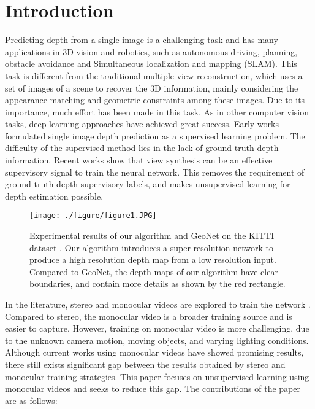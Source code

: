 \documentclass[10pt,twocolumn,letterpaper]{article}
\begin{document}
\section{Introduction}

Predicting depth from a single image is a challenging task and has many applications in 3D vision and robotics, such as autonomous driving, planning, obstacle avoidance and Simultaneous localization and mapping (SLAM). This task is different from the traditional multiple view reconstruction, which uses a set of images of a scene to recover the 3D information, mainly considering the appearance matching and geometric constraints among these images. Due to its importance, much effort has been made in this task. As in other computer vision tasks, deep learning approaches have achieved great
success. Early works \cite{li2015depth,liu2015deep,wang2015towards,liu2016learning} formulated single image depth prediction as a supervised learning problem. The difficulty of the supervised method lies in the lack of ground truth depth information. Recent works \cite{godard2017unsupervised,zhou2017unsupervised,godard2017unsupervised,zou2018df,zhan2018unsupervised,wang2018learning,yang2018unsupervised,aleotti2018generative} show that view synthesis can be an effective supervisory signal to train the neural network. This removes the requirement of ground truth depth supervisory labels, and makes unsupervised learning for depth estimation possible. 
\begin{figure}
	\centering
	\texttt{[image: ./figure/figure1.JPG]}	
	\caption{Experimental results of our algorithm and GeoNet \cite{yin2018geonet} on the KITTI dataset \cite{KITTI}. Our algorithm introduces a super-resolution network to produce a high resolution depth map from a low resolution input. Compared to GeoNet, the depth maps of our algorithm have clear boundaries, and contain more details as shown by the red rectangle. }
	\label{fig:introduction}
\end{figure}

In the literature, stereo and monocular videos are explored to train the network \cite{godard2017unsupervised,zhou2017unsupervised,godard2017unsupervised,zou2018df,zhan2018unsupervised,wang2018learning,yang2018unsupervised,aleotti2018generative}. Compared to stereo, the monocular video is a broader training source and is easier to capture. However, training  on monocular video is more challenging, due to the unknown camera motion, moving objects, and varying lighting conditions. Although current works \cite{zhou2017unsupervised,wang2018learning,zou2018df,yang2018unsupervised,yang2018every}  using monocular videos have showed promising results, there still exists significant gap between the results obtained by stereo and monocular training strategies. This paper focuses on unsupervised learning using monocular videos and seeks to reduce this gap. The contributions of the paper are as follows:
\end{document}
